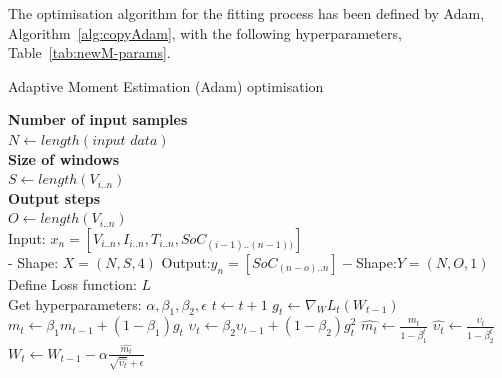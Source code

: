 %
%
The optimisation algorithm for the fitting process has been defined by Adam, \mbox{Algorithm~\ref{alg:copyAdam}}, with the following hyperparameters, \mbox{Table~\ref{tab:newM-params}}.
\begin{algorithm}
    \caption{Adaptive Moment Estimation (Adam) optimisation}
    \begin{algorithmic}[1]
        \STATE \textbf{Number of input samples} \\ $N\gets length(\textit{input data})$\\
        \STATE \textbf{Size of windows} \\ $S\gets length(V_{i..n})$\\
        \STATE \textbf{Output steps} \\ $O\gets length(V_{i..n})$\\
        \STATE Input: $x_n = [V_{i..n}, I_{i..n}, T_{i..n}, SoC_{(i-1)..(n-1))}]$ \\
         - Shape: $X = (N, S, 4)$
        \STATE Output:$y_n = [SoC_{(n-o)..n}] - $Shape:$Y = (N, O, 1)$
        \STATE Define Loss function: $L$ \\
                Get hyperparameters: $\alpha, \beta_1, \beta_2, \epsilon$
        \STATE $t \gets t+1$
        \STATE $g_t \gets \nabla_W L_t (W_{t-1})$ 
        \STATE $m_t \gets \beta_1 m_{t-1}+(1-\beta_1) g_t $ 
        \STATE $\upsilon_t \gets \beta_2 \upsilon_{t-1}+ \left(1-\beta_2 \right)g^2_t $ 
        \STATE $\hat{m_t} \gets \frac{m_t}{1-\beta^t_1}$ 
        \STATE $\hat{\upsilon_t} \gets \frac{\upsilon_t}{1-\beta^t_2} $ 
        \STATE $W_t \gets W_{t-1}- \alpha \frac{\hat{m_t}}{\sqrt{\hat{\upsilon_t}}+\epsilon} $ 
        \ENDWHILE
    \end{algorithmic}
    \label{alg:copyAdam}
\end{algorithm}
\begin{table}[htbp]
    \renewcommand{\arraystretch}{1.3}
    \caption{Optimiser specific hyperparameters}
    \centering
    \label{tab:newM-params}
\end{table}
